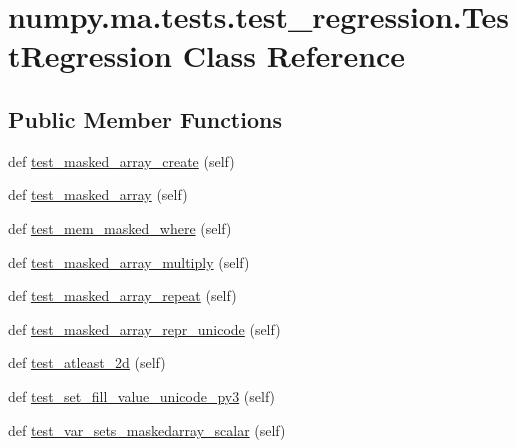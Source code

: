 \hypertarget{classnumpy_1_1ma_1_1tests_1_1test__regression_1_1TestRegression}{}\section{numpy.\+ma.\+tests.\+test\+\_\+regression.\+Test\+Regression Class Reference}
\label{classnumpy_1_1ma_1_1tests_1_1test__regression_1_1TestRegression}
\subsection*{Public Member Functions}
\begin{DoxyCompactItemize}
\item 
def \hyperlink{classnumpy_1_1ma_1_1tests_1_1test__regression_1_1TestRegression_ae16da3216746d2a18e4c281fbeecb488}{test\+\_\+masked\+\_\+array\+\_\+create} (self)
\item 
def \hyperlink{classnumpy_1_1ma_1_1tests_1_1test__regression_1_1TestRegression_a52422dd4b98bb85a649a94525e5e4932}{test\+\_\+masked\+\_\+array} (self)
\item 
def \hyperlink{classnumpy_1_1ma_1_1tests_1_1test__regression_1_1TestRegression_a1242882482bee3fa7b54c0fea6edc4ea}{test\+\_\+mem\+\_\+masked\+\_\+where} (self)
\item 
def \hyperlink{classnumpy_1_1ma_1_1tests_1_1test__regression_1_1TestRegression_a83c87fb46a8a9b3c15ea7c857a28b4d3}{test\+\_\+masked\+\_\+array\+\_\+multiply} (self)
\item 
def \hyperlink{classnumpy_1_1ma_1_1tests_1_1test__regression_1_1TestRegression_a27812f197a654970554d850619bb77dc}{test\+\_\+masked\+\_\+array\+\_\+repeat} (self)
\item 
def \hyperlink{classnumpy_1_1ma_1_1tests_1_1test__regression_1_1TestRegression_a13e64f84eb394e83276f7a5e1b31c19f}{test\+\_\+masked\+\_\+array\+\_\+repr\+\_\+unicode} (self)
\item 
def \hyperlink{classnumpy_1_1ma_1_1tests_1_1test__regression_1_1TestRegression_a0d64341bbb22ba686bdfeabbb3262f89}{test\+\_\+atleast\+\_\+2d} (self)
\item 
def \hyperlink{classnumpy_1_1ma_1_1tests_1_1test__regression_1_1TestRegression_a7c42a8a10d9cd4343353d8dd619cbe1b}{test\+\_\+set\+\_\+fill\+\_\+value\+\_\+unicode\+\_\+py3} (self)
\item 
def \hyperlink{classnumpy_1_1ma_1_1tests_1_1test__regression_1_1TestRegression_a2d23ce3b26e7cd3272fffb469f8dd943}{test\+\_\+var\+\_\+sets\+\_\+maskedarray\+\_\+scalar} (self)

\end{DoxyCompactItemize}
